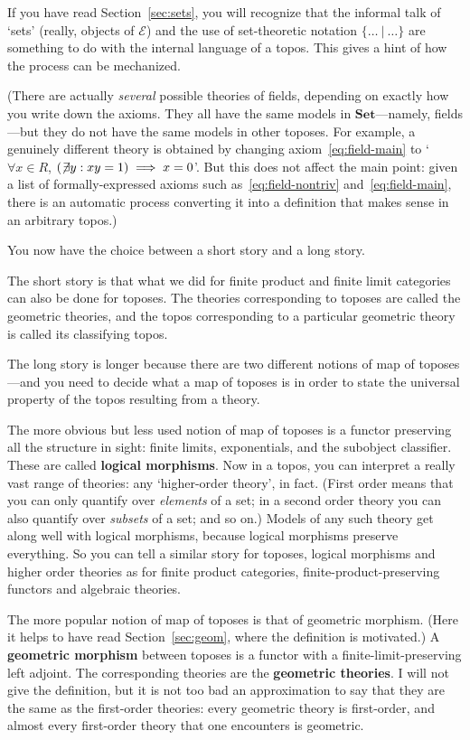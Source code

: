 \documentclass[12pt]{article}
\newcommand{\cat}[1]{\mathscr{#1}}
\newcommand{\fcat}[1]{\mathbf{#1}}
\newcommand{\such}{\:|\:}
\newcommand{\Set}{\fcat{Set}}
\newcommand{\demph}[1]{\textbf{\textup{#1}}}
\newcommand{\E}{\cat{E}}
\begin{document}
If you have read Section~\ref{sec:sets}, you will recognize that the informal
talk of `sets' (really, objects of $\E$) and the use of set-theoretic notation
$\{ \ldots \such \ldots \}$ are something to do with the internal language of
a topos.  This gives a hint of how the process can be mechanized.

(There are actually \emph{several} possible theories of fields, depending on
exactly how you write down the axioms.  They all have the same models in
$\Set$---namely, fields---but they do not have the same models in other
toposes.  For example, a genuinely different theory is obtained by changing
axiom~\eqref{eq:field-main} to `$\forall x \in R$, $(\not\!\exists y: xy = 1)
\implies x = 0$'.  But this does not affect the main point: given a list of
formally-expressed axioms such as~\eqref{eq:field-nontriv}
and~\eqref{eq:field-main}, there is an automatic process converting it into a
definition that makes sense in an arbitrary topos.)

You now have the choice between a short story and a long story. 

The short story is that what we did for finite product and finite limit
categories can also be done for toposes.  The theories corresponding to
toposes are called the geometric theories, and the topos corresponding to a
particular geometric theory is called its classifying topos.

The long story is longer because there are two different notions of map of
toposes---and you need to decide what a map of toposes is in order to state
the universal property of the topos resulting from a theory.  

The more obvious but less used notion of map of toposes is a functor
preserving all the structure in sight: finite limits, exponentials, and the
subobject classifier.  These are called \demph{logical morphisms}.  Now in a
topos, you can interpret a really vast range of theories: any `higher-order
theory', in fact.  (First order means that you can only quantify over
\emph{elements} of a set; in a second order theory you can also quantify over
\emph{subsets} of a set; and so on.)  Models of any such theory get along well
with logical morphisms, because logical morphisms preserve everything.  So you
can tell a similar story for toposes, logical morphisms and higher order
theories as for finite product categories, finite-product-preserving functors
and algebraic theories.

The more popular notion of map of toposes is that of geometric
morphism.  (Here it helps to have read Section~\ref{sec:geom}, where the
definition is motivated.)  A \demph{geometric morphism} between toposes is a
functor with a finite-limit-preserving left adjoint.  The corresponding
theories are the \demph{geometric theories}.  I will not give the definition,
but it is not too bad an approximation to say that they are the same as the
first-order theories: every geometric theory is first-order, and almost every
first-order theory that one encounters is geometric.
\end{document}
